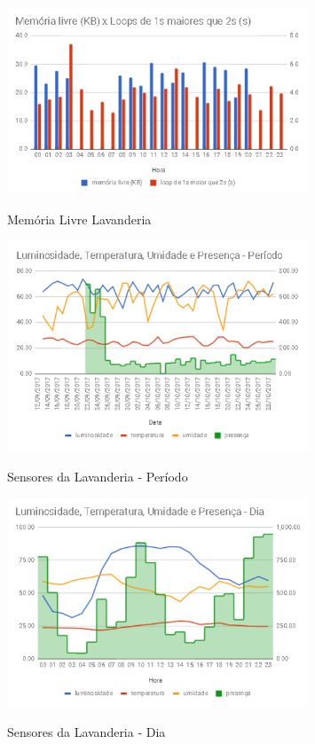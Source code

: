 \begin{figure}[H]
	\centering
	\caption{Memória Livre Lavanderia}
	\includegraphics[width=0.8\textwidth]{memLivreLavanderia}
	\label{fig:memLivreLavanderia}
\end{figure}

\begin{figure}[H]
	\centering
	\caption{Sensores da Lavanderia - Período}
	\includegraphics[width=0.8\textwidth]{lavanderiaperiodosensores}
	\label{fig:lavanderiaperiodosensores}
\end{figure}

\begin{figure}[H]
	\centering
	\caption{Sensores da Lavanderia - Dia}
	\includegraphics[width=0.8\textwidth]{lavanderiadiasensores}
	\label{fig:lavanderiadiasensores}
\end{figure}

